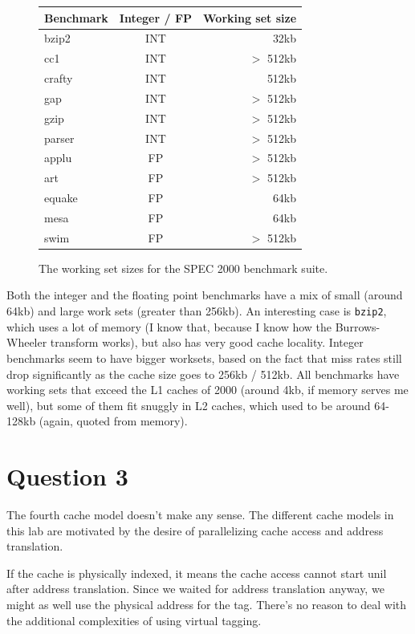 \begin{figure}[htb]
\center

\begin{tabular}{lcr}
\hline
Benchmark & Integer / FP & Working set size \\
\hline
bzip2 & INT & 32kb \\
cc1 & INT & $>$ 512kb \\
crafty & INT & 512kb \\
gap & INT & $>$ 512kb \\
gzip & INT & $>$ 512kb \\
parser & INT & $>$ 512kb \\
\hline
applu & FP & $>$ 512kb \\
art & FP & $>$ 512kb \\
equake & FP & 64kb \\
mesa & FP & 64kb \\
swim & FP & $>$ 512kb \\
\hline
\end{tabular}

\caption{The working set sizes for the SPEC 2000 benchmark suite. }
\label{q2:working_set}
\end{figure}

Both the integer and the floating point benchmarks have a mix of small
(around 64kb) and large work sets (greater than 256kb). An interesting case is
\texttt{bzip2}, which uses a lot of memory (I know that, because I know how the
Burrows-Wheeler transform works), but also has very good cache locality.
Integer benchmarks seem to have bigger worksets, based on the fact that miss
rates still drop significantly as the cache size goes to 256kb / 512kb. All
benchmarks have working sets that exceed the L1 caches of 2000 (around 4kb, if
memory serves me well), but some of them fit snuggly in L2 caches, which used
to be around 64-128kb (again, quoted from memory).

\section{Question 3}
The fourth cache model doesn't make any sense. The different cache models in
this lab are motivated by the desire of parallelizing cache access and address
translation.

If the cache is physically indexed, it means the cache access cannot start unil
after address translation. Since we waited for address translation anyway, we
might as well use the physical address for the tag. There's no reason to deal
with the additional complexities of using virtual tagging.

